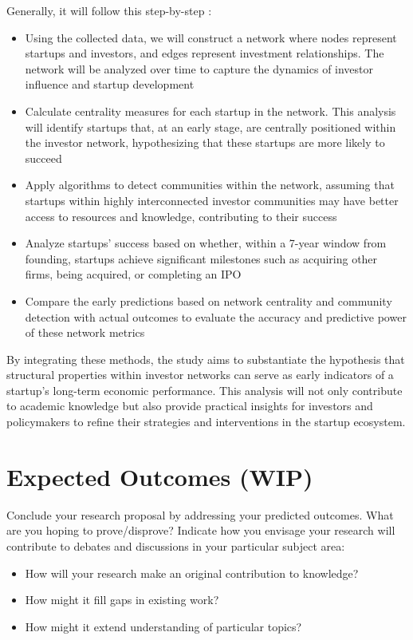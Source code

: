 \documentclass[a4paper,11pt]{article}
\begin{document}
Generally, it will follow this step-by-step : 
\begin{itemize}
    \item Using the collected data, we will construct a network where nodes represent startups and investors, and edges represent investment relationships. The network will be analyzed over time to capture the dynamics of investor influence and startup development
    \item Calculate centrality measures for each startup in the network. This analysis will identify startups that, at an early stage, are centrally positioned within the investor network, hypothesizing that these startups are more likely to succeed
    \item Apply algorithms to detect communities within the network, assuming that startups within highly interconnected investor communities may have better access to resources and knowledge, contributing to their success
    \item Analyze startups' success based on whether, within a 7-year window from founding, startups achieve significant milestones such as acquiring other firms, being acquired, or completing an IPO
    \item Compare the early predictions based on network centrality and community detection with actual outcomes to evaluate the accuracy and predictive power of these network metrics
\end{itemize}

By integrating these methods, the study aims to substantiate the hypothesis that structural properties within investor networks can serve as early indicators of a startup's long-term economic performance. This analysis will not only contribute to academic knowledge but also provide practical insights for investors and policymakers to refine their strategies and interventions in the startup ecosystem.

\section{Expected Outcomes (WIP)}

Conclude your research proposal by addressing your predicted outcomes. What are you hoping to prove/disprove? Indicate how you envisage your research will contribute to debates and discussions in your particular subject area:

\begin{itemize}
    \item How will your research make an original contribution to knowledge?
    \item How might it fill gaps in existing work? 
    \item How might it extend understanding of particular topics?
\end{itemize}
\end{document}
